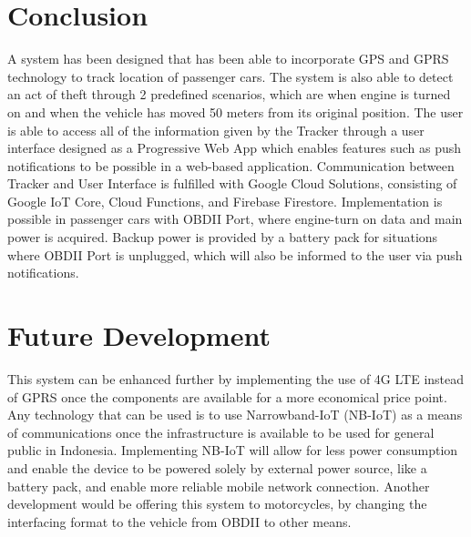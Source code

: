 \documentclass[conference]{IEEEtran}
\begin{document}
\section{Conclusion}
A system has been designed that has been able to incorporate GPS and GPRS technology to track location of passenger cars. The system is also able to detect an act of theft through 2 predefined scenarios, which are when engine is turned on and when the vehicle has moved 50 meters from its original position. The user is able to access all of the information given by the Tracker through a user interface designed as a Progressive Web App which enables features such as push notifications to be possible in a web-based application. Communication between Tracker and User Interface is fulfilled with Google Cloud Solutions, consisting of Google IoT Core, Cloud Functions, and Firebase Firestore. Implementation is possible in passenger cars with OBDII Port, where engine-turn on data and main power is acquired. Backup power is provided by a battery pack for situations where OBDII Port is unplugged, which will also be informed to the user via push notifications. 


\section{Future Development}
This system can be enhanced further by implementing the use of 4G LTE instead of GPRS once the components are available for a more economical price point. Any technology that can be used is to use Narrowband-IoT (NB-IoT) as a means of communications once the infrastructure is available to be used for general public in Indonesia. Implementing NB-IoT will allow for less power consumption and enable the device to be powered solely by external power source, like a battery pack, and enable more reliable mobile network connection. Another development would be offering this system to motorcycles, by changing the interfacing format to the vehicle from OBDII to other means.




\end{document}
